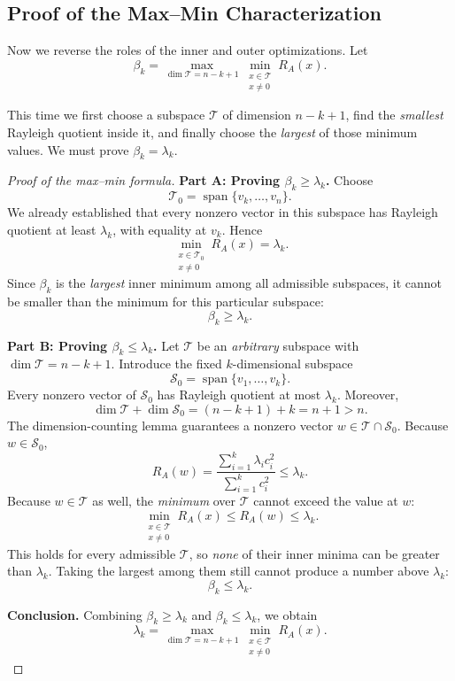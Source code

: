 \documentclass[14pt,letterpaper]{article}
\theoremstyle{plain}
\theoremstyle{definition}
\theoremstyle{remark}
\DeclareMathOperator{\Span}{span}
\begin{document}
\subsection{Proof of the Max--Min Characterization}
\label{subsec:courant_maxmin_proof}

Now we reverse the roles of the inner and outer
optimizations. Let
\[
\boxed{
\beta_k=
\max_{\dim\mathcal T=n-k+1}
\min_{\substack{x\in\mathcal T\\x\neq0}}R_A(x).
}
\]

This time we first choose a subspace $\mathcal T$ of
dimension $n-k+1$, find the \emph{smallest} Rayleigh
quotient inside it, and finally choose the
\emph{largest} of those minimum values.
We must prove $\beta_k=\lambda_k$.

\begin{proof}[Proof of the max--min formula]
\medskip
\noindent\textbf{Part A: Proving $\beta_k\geq\lambda_k$.}\quad
Choose
\[
\mathcal T_0=\Span\{v_k,\ldots,v_n\}.
\]
We already established that every nonzero vector in
this subspace has Rayleigh quotient at least
$\lambda_k$, with equality at $v_k$. Hence
\[
\min_{\substack{x\in\mathcal T_0\\x\neq0}}R_A(x)
=\lambda_k.
\]
Since $\beta_k$ is the \emph{largest} inner minimum
among all admissible subspaces, it cannot be smaller
than the minimum for this particular subspace:
\[
\boxed{\beta_k\geq\lambda_k.}
\]

\medskip
\noindent\textbf{Part B: Proving $\beta_k\leq\lambda_k$.}\quad
Let $\mathcal T$ be an \emph{arbitrary} subspace
with $\dim\mathcal T=n-k+1$. Introduce the fixed
$k$-dimensional subspace
\[
\mathcal S_0=\Span\{v_1,\ldots,v_k\}.
\]
Every nonzero vector of $\mathcal S_0$ has Rayleigh
quotient at most $\lambda_k$. Moreover,
\[
\dim\mathcal T+\dim\mathcal S_0
=(n-k+1)+k=n+1>n.
\]
The dimension-counting lemma guarantees a nonzero
vector $w\in\mathcal T\cap\mathcal S_0$.
Because $w\in\mathcal S_0$,
\[
R_A(w)
=\frac{\sum_{i=1}^k\lambda_i c_i^2}
       {\sum_{i=1}^k c_i^2}
\leq\lambda_k.
\]
Because $w\in\mathcal T$ as well, the \emph{minimum}
over $\mathcal T$ cannot exceed the value at $w$:
\[
\boxed{
\min_{\substack{x\in\mathcal T\\x\neq0}}R_A(x)
\leq R_A(w)\leq\lambda_k.
}
\]
This holds for every admissible $\mathcal T$, so
\emph{none} of their inner minima can be greater than
$\lambda_k$. Taking the largest among them still
cannot produce a number above $\lambda_k$:
\[
\boxed{\beta_k\leq\lambda_k.}
\]

\medskip
\noindent\textbf{Conclusion.}\quad
Combining $\beta_k\geq\lambda_k$ and
$\beta_k\leq\lambda_k$, we obtain
\[
\boxed{
\lambda_k=
\max_{\dim\mathcal T=n-k+1}
\min_{\substack{x\in\mathcal T\\x\neq0}}R_A(x).
}
\]
\end{proof}
\end{document}
